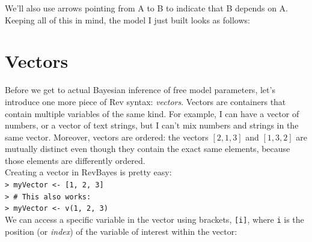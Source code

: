 \documentclass[12pt]{article}
\begin{document}
\noindent We'll also use arrows pointing from A to B to indicate that B depends on A. Keeping all of this in mind, the model I just built looks as follows: \\

\begin{figure}[h]
\centering
{}
\end{figure}

\vspace*{-1cm}

\section*{Vectors}

Before we get to actual Bayesian inference of free model parameters, let's introduce one more piece of Rev syntax: \textit{vectors}. Vectors are containers that contain multiple variables of the same kind. For example, I can have a vector of numbers, or a vector of text strings, but I can't mix numbers and strings in the same vector. Moreover, vectors are ordered: the vectors $[2, 1, 3]$ and $[1, 3, 2]$ are mutually distinct even though they contain the exact same elements, because those elements are differently ordered. \\

\noindent Creating a vector in RevBayes is pretty easy: \\

\indent \texttt{> myVector <- [1, 2, 3]} \\
\indent \texttt{> \# This also works:} \\
\indent \texttt{> myVector <- v(1, 2, 3)} \\

\noindent We can access a specific variable in the vector using brackets, \texttt{[i]}, where \texttt{i} is the position (or \textit{index}) of the variable of interest within the vector: \\
\end{document}
